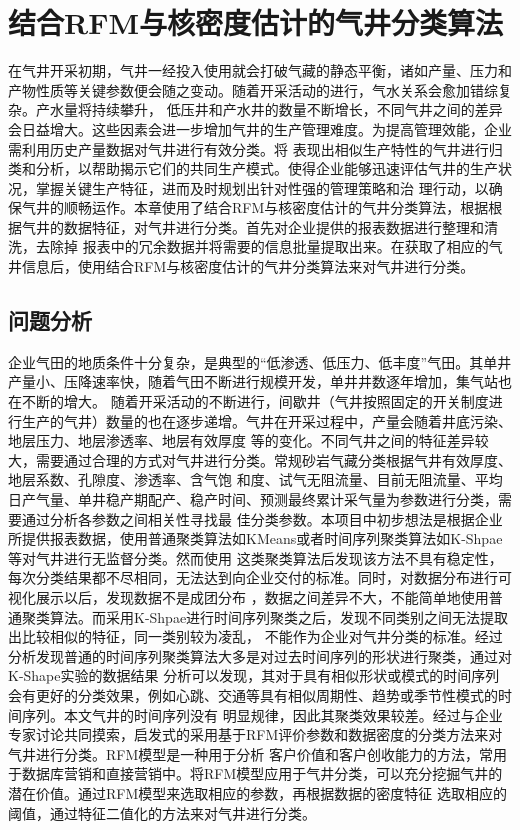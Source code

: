 \chapter{结合RFM与核密度估计的气井分类算法}
在气井开采初期，气井一经投入使用就会打破气藏的静态平衡，诸如产量、压力和产物性质等关键参数便会随之变动。随着开采活动的进行，气水关系会愈加错综复杂。产水量将持续攀升，
低压井和产水井的数量不断增长，不同气井之间的差异会日益增大。这些因素会进一步增加气井的生产管理难度。为提高管理效能，企业需利用历史产量数据对气井进行有效分类。将
表现出相似生产特性的气井进行归类和分析，以帮助揭示它们的共同生产模式。使得企业能够迅速评估气井的生产状况，掌握关键生产特征，进而及时规划出针对性强的管理策略和治
理行动，以确保气井的顺畅运作。本章使用了结合RFM与核密度估计的气井分类算法，根据根据气井的数据特征，对气井进行分类。首先对企业提供的报表数据进行整理和清洗，去除掉
报表中的冗余数据并将需要的信息批量提取出来。在获取了相应的气井信息后，使用结合RFM与核密度估计的气井分类算法来对气井进行分类。
\section{问题分析}
企业气田的地质条件十分复杂，是典型的“低渗透、低压力、低丰度”气田。其单井产量小、压降速率快，随着气田不断进行规模开发，单井井数逐年增加，集气站也在不断的增大。
随着开采活动的不断进行，间歇井（气井按照固定的开关制度进行生产的气井）数量的也在逐步递增。气井在开采过程中，产量会随着井底污染、地层压力、地层渗透率、地层有效厚度
等的变化。不同气井之间的特征差异较大，需要通过合理的方式对气井进行分类。常规砂岩气藏分类根据气井有效厚度、地层系数、孔隙度、渗透率、含气饱
和度、试气无阻流量、目前无阻流量、平均日产气量、单井稳产期配产、稳产时间、预测最终累计采气量为参数进行分类，需要通过分析各参数之间相关性寻找最
佳分类参数。本项目中初步想法是根据企业所提供报表数据，使用普通聚类算法如KMeans或者时间序列聚类算法如K-Shpae等对气井进行无监督分类。然而使用
这类聚类算法后发现该方法不具有稳定性，每次分类结果都不尽相同，无法达到向企业交付的标准。同时，对数据分布进行可视化展示以后，发现数据不是成团分布
，数据之间差异不大，不能简单地使用普通聚类算法。而采用K-Shpae进行时间序列聚类之后，发现不同类别之间无法提取出比较相似的特征，同一类别较为凌乱，
不能作为企业对气井分类的标准。经过分析发现普通的时间序列聚类算法大多是对过去时间序列的形状进行聚类，通过对K-Shape实验的数据结果\cite{Kshapeexperiment}
分析可以发现，其对于具有相似形状或模式的时间序列会有更好的分类效果，例如心跳、交通等具有相似周期性、趋势或季节性模式的时间序列。本文气井的时间序列没有
明显规律，因此其聚类效果较差。经过与企业专家讨论共同摸索，启发式的采用基于RFM\cite{birant2011data}评价参数和数据密度的分类方法来对气井进行分类。RFM模型是一种用于分析
客户价值和客户创收能力的方法，常用于数据库营销和直接营销中。将RFM模型应用于气井分类，可以充分挖掘气井的潜在价值。通过RFM模型来选取相应的参数，再根据数据的密度特征
选取相应的阈值，通过特征二值化的方法来对气井进行分类。

